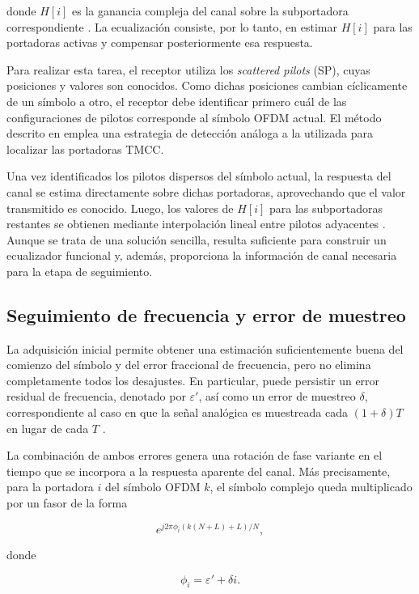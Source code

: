 donde $H[i]$ es la ganancia compleja del canal sobre la subportadora correspondiente \cite{uruguay_rx}. La ecualización consiste, por lo tanto, en estimar $H[i]$ para las portadoras activas y compensar posteriormente esa respuesta.

Para realizar esta tarea, el receptor utiliza los \textit{scattered pilots} (SP), cuyas posiciones y valores son conocidos. Como dichas posiciones cambian cíclicamente de un símbolo a otro, el receptor debe identificar primero cuál de las configuraciones de pilotos corresponde al símbolo OFDM actual. El método descrito en \cite{uruguay_rx} emplea una estrategia de detección análoga a la utilizada para localizar las portadoras TMCC.

Una vez identificados los pilotos dispersos del símbolo actual, la respuesta del canal se estima directamente sobre dichas portadoras, aprovechando que el valor transmitido es conocido. Luego, los valores de $H[i]$ para las subportadoras restantes se obtienen mediante interpolación lineal entre pilotos adyacentes \cite{uruguay_rx}. Aunque se trata de una solución sencilla, resulta suficiente para construir un ecualizador funcional y, además, proporciona la información de canal necesaria para la etapa de seguimiento.

\subsection{Seguimiento de frecuencia y error de muestreo}

La adquisición inicial permite obtener una estimación suficientemente buena del comienzo del símbolo y del error fraccional de frecuencia, pero no elimina completamente todos los desajustes. En particular, puede persistir un error residual de frecuencia, denotado por $\varepsilon'$, así como un error de muestreo $\delta$, correspondiente al caso en que la señal analógica es muestreada cada $(1+\delta)T$ en lugar de cada $T$ \cite{uruguay_rx}.

La combinación de ambos errores genera una rotación de fase variante en el tiempo que se incorpora a la respuesta aparente del canal. Más precisamente, para la portadora $i$ del símbolo OFDM $k$, el símbolo complejo queda multiplicado por un fasor de la forma

\begin{equation}
e^{j2\pi \phi_i (k(N+L)+L)/N},
\end{equation}

donde

\begin{equation}
\phi_i = \varepsilon' + \delta i.
\end{equation}

